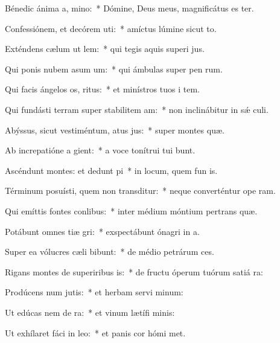 \item Bénedic ánima a, mino:~* Dómine, Deus meus, magnificátus es ter.
\item Confessiónem, et decórem uti:~* amíctus lúmine sicut to.
\item Exténdens cælum ut lem:~* qui tegis aquis superi jus.
\item Qui ponis nubem asum um:~* qui ámbulas super pen rum.
\item Qui facis ángelos os, ritus:~* et minístros tuos i tem.
\item Qui fundásti terram super stabilitem am:~* non inclinábitur in sǽ culi.
\item Abýssus, sicut vestiméntum, atus jus:~* super montes  quæ.
\item Ab increpatióne a gient:~* a voce tonítrui tui bunt.
\item Ascéndunt montes: et dedunt pi~* in locum, quem fun is.
\item Términum posuísti, quem non transditur:~* neque converténtur ope ram.
\item Qui emíttis fontes  conlibus:~* inter médium móntium pertrans quæ.
\item Potábunt omnes tiæ gri:~* exspectábunt ónagri in  a.
\item Super ea vólucres cæli bibunt:~* de médio petrárum  ces.
\item Rigans montes de superiribus is:~* de fructu óperum tuórum satiá ra:
\item Prodúcens num jutis:~* et herbam servi minum:
\item Ut edúcas nem de ra:~* et vinum lætífi  minis:
\item Ut exhílaret fáci in leo:~* et panis cor hómi met.
